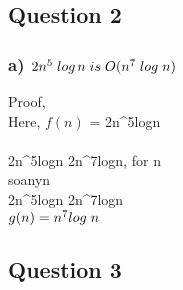 \documentclass[10pt, a4paper]{article}
\begin{document}
    \newpage
	
	\subsection*{Question 2}
	
	\subsubsection*{a) $2n^5\hspace{0.1cm}log\hspace{0.05cm}n\hspace{0.1cm}is\hspace{0.1cm}O(n^7\hspace{0.1cm}log\hspace{0.1cm}n)$}
	Proof,\\
	Here, {$f(n)$} = {2n^5log\hspace{0.1cm}n} \\\\
	{2n^5log\hspace{0.1cm}n \leq 2n^7log\hspace{0.1cm}n}, \hspace{0.5cm} for \hspace{0.2cm} n  \\
	{so\hspace{0.1cm}any\hspace{0.1cm}n } \\
	{2n^5log\hspace{0.1cm}n \leq 2n^7log\hspace{0.1cm}n} \\
	\rightarrow \hspace{0.1cm} $g(n) = n^7log\hspace{0.1cm}n$ 
	   
	\newpage
	
	\subsection*{Question 3}
	
\end{document}
